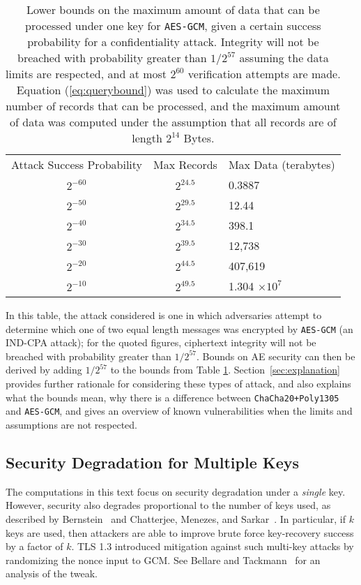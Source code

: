 \documentclass{article}
\begin{document}
\medskip
\begin{table}[H]
  \centering
  \caption{Lower bounds on the maximum amount of data that can be processed under one key for \texttt{AES-GCM}, given a certain success probability for a confidentiality attack. Integrity will not be breached with probability greater than $1/2^{57}$ assuming the data limits are respected, and at most $2^{60}$ verification attempts are made. Equation (\ref{eq:querybound}) was used to calculate the maximum number of records that can be processed, and the maximum amount of data was computed under the assumption that all records are of length $2^{14}$ Bytes.}\label{table:gcm-bounds}
  \begin{tabular}{ccl}
    \toprule
    Attack Success Probability  & Max Records & Max Data (terabytes)\\
    \cmidrule{1-3}
    $2^{-60}$ & $2^{24.5}$ & 0.3887\\
    $2^{-50}$ & $2^{29.5}$ & 12.44 \\
    $2^{-40}$ & $2^{34.5}$ & 398.1\\
    $2^{-30}$ & $2^{39.5}$ & 12,738\\
    $2^{-20}$ & $2^{44.5}$ & 407,619\\
    $2^{-10}$ & $2^{49.5}$ & 1.304 $\times 10^7$\\
    \bottomrule
  \end{tabular}
\end{table}
\medskip

In this table, the attack considered is one in which adversaries attempt to determine which one of two equal length messages was encrypted by \texttt{AES-GCM} (an IND-CPA attack); for the quoted figures, ciphertext integrity will not be breached with probability greater than $1/2^{57}$. Bounds on AE security can then be derived by adding  $1/2^{57}$ to the bounds from Table \ref{table:gcm-bounds}. Section~\ref{sec:explanation} provides further rationale for considering these types of attack, and also explains what the bounds mean, why there is a difference between \texttt{ChaCha20+Poly1305} and \texttt{AES-GCM}, and gives an overview of known vulnerabilities when the limits and assumptions are not respected.

\subsection{Security Degradation for Multiple Keys}

The computations in this text focus on security degradation under a \emph{single} key. However, security also degrades proportional to the number of keys used, as described by Bernstein~\cite{bernsteinblog} and Chatterjee, Menezes, and Sarkar~\cite{DBLP:conf/sacrypt/ChatterjeeMS11,DBLP:journals/iacr/ChatterjeeMS11}. In particular, if $k$ keys are used, then attackers are able to improve brute force key-recovery success by a factor of $k$. TLS 1.3 introduced mitigation against such multi-key attacks by randomizing the nonce input to GCM. See Bellare and Tackmann~\cite{DBLP:conf/crypto/BellareT16} for an analysis of the tweak.
\end{document}
